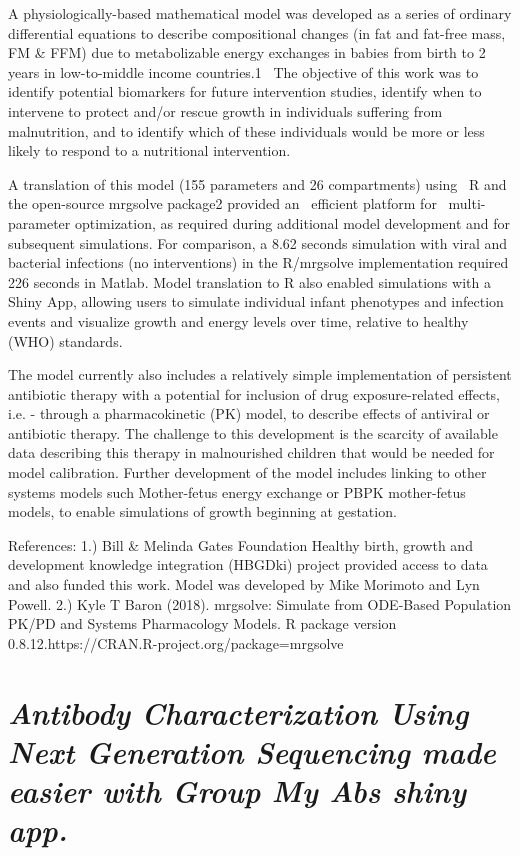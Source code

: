 \documentclass[]{book}
\theoremstyle{definition}
\theoremstyle{definition}
\theoremstyle{definition}
\theoremstyle{remark}
\begin{document}
A physiologically-based mathematical model was developed as a series of
ordinary differential equations to describe compositional changes (in
fat and fat-free mass, FM \& FFM) due to metabolizable energy exchanges
in babies from birth to 2 years in low-to-middle income countries.1 ~The
objective of this work was to identify potential biomarkers for future
intervention studies, identify when to intervene to protect and/or
rescue growth in individuals suffering from malnutrition, and to
identify which of these individuals would be more or less likely to
respond to a nutritional intervention.

A translation of this model (155 parameters and 26 compartments) using
~R and the open-source mrgsolve package2 provided an ~efficient platform
for ~multi-parameter optimization, as required during additional model
development and for subsequent simulations. For comparison, a 8.62
seconds simulation with viral and bacterial infections (no
interventions) in the R/mrgsolve implementation required 226 seconds in
Matlab. Model translation to R also enabled simulations with a Shiny
App, allowing users to simulate individual infant phenotypes and
infection events and visualize growth and energy levels over time,
relative to healthy (WHO) standards.

The model currently also includes a relatively simple implementation of
persistent antibiotic therapy with a potential for inclusion of drug
exposure-related effects, i.e. - through a pharmacokinetic (PK) model,
to describe effects of antiviral or antibiotic therapy. The challenge to
this development is the scarcity of available data describing this
therapy in malnourished children that would be needed for model
calibration. Further development of the model includes linking to other
systems models such Mother-fetus energy exchange or PBPK mother-fetus
models, to enable simulations of growth beginning at gestation.

References: 1.) Bill \& Melinda Gates Foundation Healthy birth, growth
and development knowledge integration (HBGDki) project provided access
to data and also funded this work. Model was developed by Mike Morimoto
and Lyn Powell. 2.) Kyle T Baron (2018). mrgsolve: Simulate from
ODE-Based Population PK/PD and Systems Pharmacology Models. R package
version 0.8.12.https://CRAN.R-project.org/package=mrgsolve

\hypertarget{antibody-characterization-using-next-generation-sequencing-made-easier-with-group-my-abs-shiny-app.-1}{%
\section{\texorpdfstring{\emph{Antibody Characterization Using Next
Generation Sequencing made easier with Group My Abs shiny
app.}}{Antibody Characterization Using Next Generation Sequencing made easier with Group My Abs shiny app.}}\label{antibody-characterization-using-next-generation-sequencing-made-easier-with-group-my-abs-shiny-app.-1}}
\end{document}

